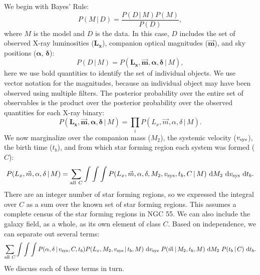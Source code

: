 \documentclass[12pt, preprint]{aastex}
\newcommand{\given}{\,|\,}
\newcommand{\dd}{\mathrm{d}}
\newcommand{\bs}[1]{\boldsymbol{#1}}
\begin{document}
We begin with Bayes' Rule:
\begin{equation}
P( M \given D ) = \frac{P( D \given M ) P(M)}{P(D)},
\end{equation}
where $M$ is the model and $D$ is the data. In this case, $D$ includes the set of observed X-ray luminosities ($\bs{L_x}$), companion optical magnitudes ($\bs{\vec{m}}$), and sky positions ($\bs{\alpha}$, $\bs{\delta}$):
\begin{equation}
P ( D \given M ) = P( \bs{L_x}, \bs{\vec{m}}, \bs{\alpha}, \bs{\delta} \given M),
\end{equation}
here we use bold quantities to identify the set of individual objects. We use vector notation for the magnitudes, because an individual object may have been observed using multiple filters. The posterior probability over the entire set of observables is the product over the posterior probability over the observed quantities for each X-ray binary:
\begin{equation}
P( \bs{L_x}, \bs{\vec{m}}, \bs{\alpha}, \bs{\delta} \given M) = \prod_i P( L_x, \vec{m}, \alpha, \delta \given M).
\end{equation}
We now marginalize over the companion mass ($M_2$), the systemic velocity ($v_{\rm sys}$), the birth time ($t_b$), and from which star forming region each system was formed ($C$):
\begin{equation}
P( L_x, \vec{m}, \alpha, \delta \given M) = \sum_{{\rm all}\ C} \int \int \int P( L_x, \vec{m}, \alpha, \delta, M_2, v_{\rm sys}, t_b, C \given M)\ \dd M_2\ \dd v_{\rm sys}\ \dd t_b.
\end{equation}
There are an integer number of star forming regions, so we expressed the integral over $C$ as a sum over the known set of star forming regions. This assumes a complete census of the star forming regions in NGC 55. We can also include the galaxy field, as a whole, as its own element of class $C$. Based on independence, we can separate out several terms:
\begin{equation}
\sum_{{\rm all}\ C} \int \int \int P(\alpha, \delta \given v_{\rm sys}, C, t_b) P(L_x, M_2, v_{\rm sys} \given t_b, M)\ \dd v_{\rm sys}\ P(\vec{m} \given M_2, t_b, M)\ \dd M_2\ P(t_b \given C)\ \dd t_b. \label{eq:marginalized}
\end{equation}
We discuss each of these terms in turn. 
\end{document}
